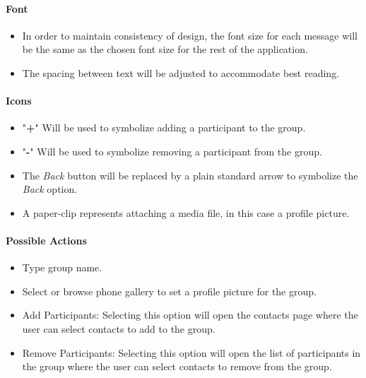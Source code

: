 \documentclass[11pt]{article}
\begin{document}
\paragraph{Font}
\begin{itemize}
\item	In order to maintain consistency of design, the font size for each message will be the same as the chosen font size for the rest of the application.
\item The spacing between text will be adjusted to accommodate best reading.\\
\end{itemize}

\paragraph{Icons}
\begin{itemize}
\item	"\textbf{+}" Will be used to symbolize adding a participant to the group.  
\item "\textbf{-}" Will be used to symbolize removing a participant from the group.
\item The \textit{Back} button will be replaced by a plain standard arrow to symbolize the \textit{Back} option. 
\item A paper-clip represents attaching a media file, in this case a profile picture.  
\end{itemize}

\paragraph{Possible Actions}
\begin{itemize}
\item Type group name.
\item Select or browse phone gallery to set a profile picture for the group.
\item	Add Participants: Selecting this option will open the contacts page where the user can select contacts to add to the group.
\item 	Remove Participants: Selecting this option will open the list of participants in the group where the user can select contacts to remove from the group.
\end{itemize}
\end{document}
